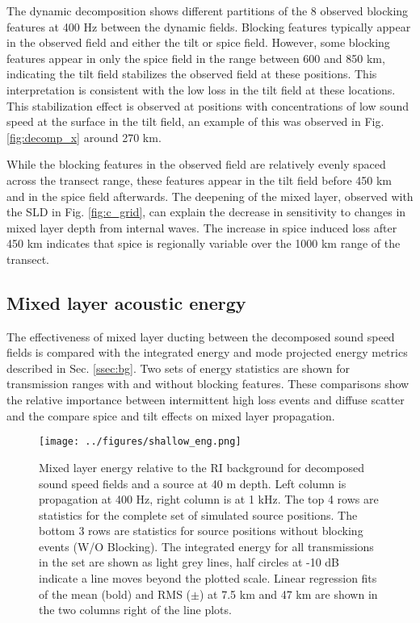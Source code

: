 \documentclass[preprint,NumberedRefs]{JASA}
\begin{document}
The dynamic decomposition shows different partitions of the 8 observed blocking features at 400 Hz between the dynamic fields. Blocking features typically appear in the observed field and either the tilt or spice field. However, some blocking features appear in only the spice field in the range between 600 and 850 km, indicating the tilt field stabilizes the observed field at these positions. This interpretation is consistent with the low loss in the tilt field at these locations. This stabilization effect is observed at positions with concentrations of low sound speed at the surface in the tilt field, an example of this was observed in Fig. \ref{fig:decomp_x} around 270 km.

While the blocking features in the observed field are relatively evenly spaced across the transect range, these features appear in the tilt field before 450 km and in the spice field afterwards. The deepening of the mixed layer, observed with the SLD in Fig. \ref{fig:c_grid}, can explain the decrease in sensitivity to changes in mixed layer depth from internal waves. The increase in spice induced loss after 450 km indicates that spice is regionally variable over the 1000 km range of the transect.

\subsection{Mixed layer acoustic energy}\label{ssec:energy}
The effectiveness of mixed layer ducting between the decomposed sound speed fields is compared with the integrated energy and mode projected energy metrics described in Sec. \ref{ssec:bg}. Two sets of energy statistics are shown for transmission ranges with and without blocking features. These comparisons show the relative importance between intermittent high loss events and diffuse scatter and the compare spice and tilt effects on mixed layer propagation.

\begin{figure}
\texttt{[image: ../figures/shallow\_eng.png]}
    \caption{Mixed layer energy relative to the RI background for decomposed sound speed fields and a source at 40 m depth. Left column is propagation at 400 Hz, right column is at 1 kHz. The top 4 rows are statistics for the complete set of simulated source positions. The bottom 3 rows are statistics for source positions without blocking events (W/O Blocking). The integrated energy for all transmissions in the set are shown as light grey lines, half circles at -10 dB indicate a line moves beyond the plotted scale. Linear regression fits of the mean (bold) and RMS ($\pm$) at 7.5 km and 47 km are shown in the two columns right of the line plots.}
    \label{fig:shal_eng}
\end{figure}
\end{document}
